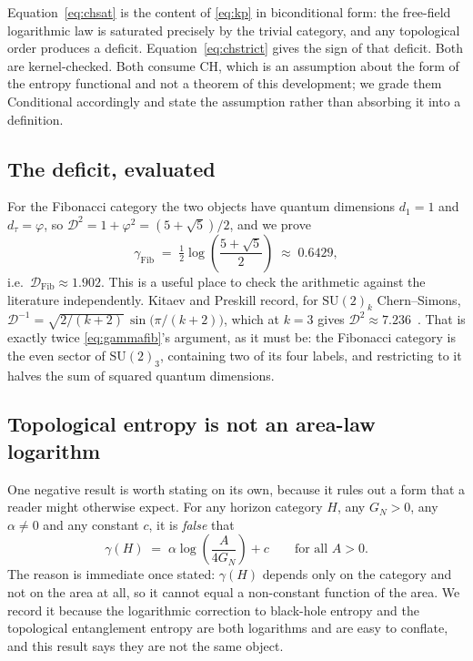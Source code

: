 \documentclass[aps,prx,nofootinbib,superscriptaddress,12pt]{revtex4-2}
\begin{document}
Equation~\eqref{eq:chsat} is the content of \eqref{eq:kp} in
biconditional form: the free-field logarithmic law is saturated precisely
by the trivial category, and any topological order produces a deficit.
Equation~\eqref{eq:chstrict} gives the sign of that deficit. Both are
kernel-checked. Both consume $\mathrm{CH}$, which is an assumption about
the form of the entropy functional and not a theorem of this
development; we grade them Conditional accordingly and state the
assumption rather than absorbing it into a definition.

\subsection{The deficit, evaluated}

For the Fibonacci category the two objects have quantum dimensions
$d_1 = 1$ and $d_\tau = \varphi$, so
$\mathcal{D}^2 = 1 + \varphi^2 = (5+\sqrt5)/2$, and we prove
\begin{equation}
\gamma_{\mathrm{Fib}}
 \;=\; \tfrac12 \log\!\left(\frac{5+\sqrt5}{2}\right)
 \;\approx\; 0.6429 ,
\label{eq:gammafib}
\end{equation}
i.e.\ $\mathcal{D}_{\mathrm{Fib}} \approx 1.902$. This is a useful place
to check the arithmetic against the literature independently.
Kitaev and Preskill record, for $\mathrm{SU}(2)_k$ Chern--Simons,
$\mathcal{D}^{-1} = \sqrt{2/(k+2)}\,\sin\bigl(\pi/(k+2)\bigr)$, which at
$k=3$ gives $\mathcal{D}^2 \approx 7.236$~\cite{KitaevPreskill2006}. That
is exactly twice \eqref{eq:gammafib}'s argument, as it must be: the
Fibonacci category is the even sector of $\mathrm{SU}(2)_3$, containing
two of its four labels, and restricting to it halves the sum of squared
quantum dimensions.

\subsection{Topological entropy is not an area-law logarithm}

One negative result is worth stating on its own, because it rules out a
form that a reader might otherwise expect. For any horizon category $H$,
any $G_N > 0$, any $\alpha \neq 0$ and any constant $c$, it is
\emph{false} that
\[
\gamma(H) \;=\; \alpha \log\!\left(\frac{A}{4G_N}\right) + c
\qquad \text{for all } A > 0 .
\]
The reason is immediate once stated: $\gamma(H)$ depends only on the
category and not on the area at all, so it cannot equal a non-constant
function of the area. We record it because the logarithmic correction to
black-hole entropy and the topological entanglement entropy are both
logarithms and are easy to conflate, and this result says they are not
the same object.
\end{document}
